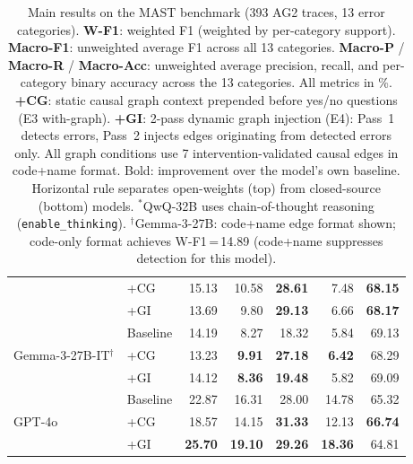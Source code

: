 \begin{table}[t]
\begin{tabular}{l l rrrrr}
  & +CG      &        15.13   &        10.58   & \textbf{28.61} &         7.48   & \textbf{68.15} \\
  & +GI      &        13.69   &         9.80   & \textbf{29.13} &         6.66   & \textbf{68.17} \\[3pt]
\multirow{3}{*}{Gemma-3-27B-IT$^{\dagger}$}
  & Baseline &        14.19   &         8.27   &        18.32   &         5.84   &        69.13  \\
  & +CG      &        13.23   & \textbf{9.91}  & \textbf{27.18} & \textbf{6.42}  &        68.29  \\
  & +GI      &        14.12   & \textbf{8.36}  & \textbf{19.48} &         5.82   &        69.09  \\[3pt]
\midrule
\multirow{3}{*}{GPT-4o}
  & Baseline &        22.87   &        16.31   &        28.00   &        14.78   &        65.32  \\
  & +CG      &        18.57   &        14.15   & \textbf{31.33} &        12.13   & \textbf{66.74} \\
  & +GI      & \textbf{25.70} & \textbf{19.10} & \textbf{29.26} & \textbf{18.36} &        64.81  \\
\bottomrule
\end{tabular}
\caption{%
  Main results on the MAST benchmark (393 AG2 traces, 13 error categories).
  \textbf{W-F1}: weighted F1 (weighted by per-category support).
  \textbf{Macro-F1}: unweighted average F1 across all 13 categories.
  \textbf{Macro-P} / \textbf{Macro-R} / \textbf{Macro-Acc}: unweighted average
  precision, recall, and per-category binary accuracy across the 13 categories.
  All metrics in \%.
  \textbf{+CG}: static causal graph context prepended before yes/no questions (E3 with-graph).
  \textbf{+GI}: 2-pass dynamic graph injection (E4): Pass~1 detects errors,
  Pass~2 injects edges originating from detected errors only.
  All graph conditions use 7 intervention-validated causal edges in code+name format.
  Bold: improvement over the model's own baseline.
  Horizontal rule separates open-weights (top) from closed-source (bottom) models.
  $^{*}$QwQ-32B uses chain-of-thought reasoning (\texttt{enable\_thinking}).
  $^{\dagger}$Gemma-3-27B: code+name edge format shown; code-only format achieves
  W-F1\,=\,14.89 (code+name suppresses detection for this model).%
}
\label{tab:main_results}
\end{table}


%
%

